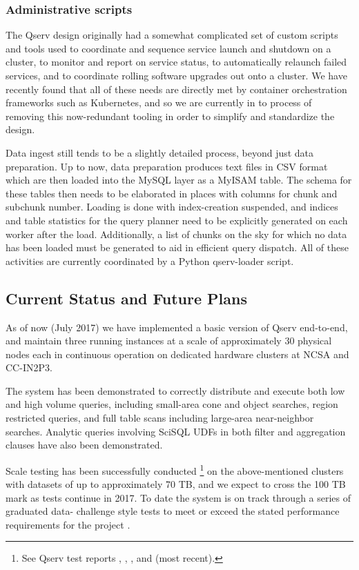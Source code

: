 \documentclass[DM,lsstdraft,toc]{lsstdoc}
\begin{document}
\subsubsection{Administrative scripts}\label{administrative-scripts}

The Qserv design originally had a somewhat complicated set of custom scripts
and tools used to coordinate and sequence service launch and shutdown on a
cluster, to monitor and report on service status, to automatically relaunch
failed services, and to coordinate rolling software upgrades out onto a
cluster.  We have recently found that all of these needs are directly met by
container orchestration frameworks such as Kubernetes, and so we are currently
in to process of removing this now-redundant tooling in order to simplify and
standardize the design.

Data ingest still tends to be a slightly detailed process, beyond just data
preparation. Up to now, data preparation produces text files in CSV format
which are then loaded into the MySQL layer as a MyISAM table. The schema for
these tables then needs to be elaborated in places with columns for chunk and
subchunk number.  Loading is done with index-creation suspended, and indices
and table statistics for the query planner need to be explicitly generated
on each worker after the load.  Additionally, a list of chunks on the sky
for which no data has been loaded must be generated to aid in efficient
query dispatch.  All of these activities are currently coordinated by a
Python qserv-loader script.

\subsection{Current Status and Future
Plans}\label{current-status-and-future-plans}

As of now (July 2017) we have implemented a basic version of Qserv end-to-end,
and maintain three running instances at a scale of approximately 30 physical
nodes each in continuous operation on dedicated hardware clusters at NCSA and
CC-IN2P3.

The system has been demonstrated to correctly distribute and execute both low
and high volume queries, including small-area cone and object searches, region
restricted queries, and full table scans including large-area near-neighbor
searches.  Analytic queries involving SciSQL UDFs in both filter and
aggregation clauses have also been demonstrated.

Scale testing has been successfully conducted \footnote{See Qserv test reports
, , , and 
(most recent).} on the above-mentioned clusters with datasets of up to
approximately 70 TB, and we expect to cross the 100 TB mark as tests continue
in 2017.  To date the system is on track through a series of graduated data-
challenge style tests  to meet or exceed the stated
performance requirements for the project .
\end{document}
